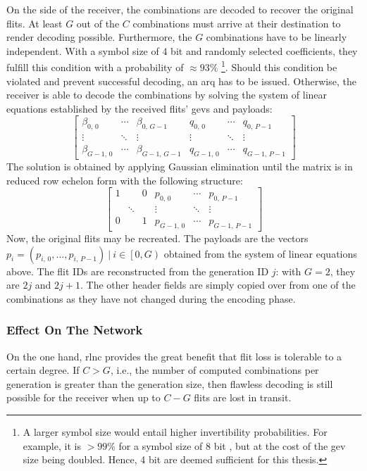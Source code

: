 On the side of the receiver, the combinations are decoded to recover the original flits. At least $G$ out of the $C$ combinations must arrive at their
destination to render decoding possible. Furthermore, the $G$ combinations have to be linearly independent. With a symbol size of 4 bit and randomly
selected coefficients, they fulfill this condition with a probability of $\approx 93\%$ \cite[4]{franz18authdraft}\footnote{A larger symbol size would
entail higher invertibility probabilities. For example, it is $>99\%$ for a symbol size of 8 bit \cite[4]{franz18authdraft}, but at the cost of the
\gls{gev} size being doubled. Hence, 4 bit are deemed sufficient for this thesis.}. Should this condition be violated and prevent successful decoding,
an \gls{arq} has to be issued. Otherwise, the receiver is able to decode the combinations by solving the system of linear equations established by the
received flits' \glspl{gev} and payloads:
\[
    \begin{bmatrix}
        \beta_{0,\,0} & \cdots & \beta_{0,\,G-1} & q_{0,\,0} & \cdots & q_{0,\,P-1} \\
        \vdots & \ddots & \vdots & \vdots & \ddots & \vdots \\
        \beta_{G-1,\,0} & \cdots & \beta_{G-1,\,G-1} & q_{G-1,\,0} & \cdots & q_{G-1,\,P-1}
    \end{bmatrix}
\]
The solution is obtained by applying Gaussian elimination until the matrix is in reduced row echelon form with the following structure:
\[
    \begin{bmatrix}
        1 & & 0 & p_{0,\,0} & \cdots & p_{0,\,P-1} \\
        & \ddots & & \vdots & \ddots & \vdots \\
        0 & & 1 & p_{G-1,\,0} & \cdots & p_{G-1,\,P-1}
    \end{bmatrix}
\]
Now, the original flits may be recreated. The payloads are the vectors $p_i = (p_{i,\,0}, …, p_{i,\,P-1})\ |\ i \in \left[0, G\right)$ obtained from
the system of linear equations above. The flit IDs are reconstructed from the generation ID $j$: with $G = 2$, they are $2j$ and $2j+1$. The other
header fields are simply copied over from one of the combinations as they have not changed during the encoding phase.

\subsubsection{Effect On The Network}
On the one hand, \gls{rlnc} provides the great benefit that flit loss is tolerable to a certain degree. If $C > G$, i.e., the number of computed
combinations per generation is greater than the generation size, then flawless decoding is still possible for the receiver when up to $C - G$ flits
are lost in transit.

